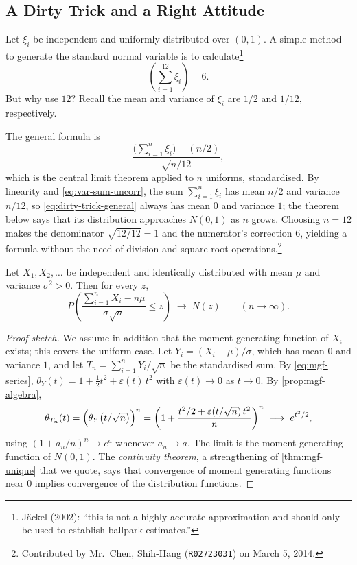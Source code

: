 \subsection{A Dirty Trick and a Right Attitude}


Let $\xi_{i}$ be independent and uniformly distributed over $(0,1)$.
A simple method to generate the standard normal variable is to calculate\footnote{J\"ackel (2002): ``this is not a highly accurate approximation and should only be used to establish ballpark estimates.''}
\begin{equation}
	\left(\sum_{i=1}^{12}\xi_{i}\right) - 6 . \label{eq:dirty-trick}
\end{equation}
But why use $12$?
Recall the mean and variance of $\xi_{i}$ are $1/2$ and $1/12$, respectively.


The general formula is
\begin{equation}
	\frac{\bigl(\sum_{i=1}^{n}\xi_{i}\bigr)-(n/2)}{\sqrt{n/12}} , \label{eq:dirty-trick-general}
\end{equation}
\suppstart
which is the central limit theorem applied to $n$ uniforms, standardised.
By linearity and \eqref{eq:var-sum-uncorr}, the sum $\sum_{i=1}^{n}\xi_{i}$ has mean $n/2$ and variance $n/12$, so \eqref{eq:dirty-trick-general} always has mean $0$ and variance $1$; the theorem below says that its distribution approaches $N(0,1)$ as $n$ grows.
\suppend
Choosing $n=12$ makes the denominator $\sqrt{12/12}=1$ and the numerator's correction $6$, yielding a formula without the need of division and square-root operations.\footnote{Contributed by Mr.~Chen, Shih-Hang (\texttt{R02723031}) on March 5, 2014.}

\suppstart
\begin{theorem}\label{thm:clt}
	Let $X_{1},X_{2},\dots$ be independent and identically distributed with mean $\mu$ and variance $\sigma^{2}>0$.
	Then for every $z$,
	\[
		P\left(\frac{\sum_{i=1}^{n}X_{i}-n\mu}{\sigma\sqrt{n}}\le z\right)\;\longrightarrow\;N(z)
		\qquad (n\to\infty) .
	\]
\end{theorem}

\begin{proof}[Proof sketch]
	We assume in addition that the moment generating function of $X_{i}$ exists; this covers the uniform case.
	Let $Y_{i}=(X_{i}-\mu)/\sigma$, which has mean $0$ and variance $1$, and let $T_{n}=\sum_{i=1}^{n}Y_{i}/\sqrt{n}$ be the standardised sum.
	By \eqref{eq:mgf-series}, $\theta_{Y}(t)=1+\tfrac12t^{2}+\varepsilon(t)\,t^{2}$ with $\varepsilon(t)\to0$ as $t\to0$.
	By \autoref{prop:mgf-algebra},
	\[
		\theta_{T_{n}}(t)=\Bigl(\theta_{Y}\bigl(t/\sqrt{n}\bigr)\Bigr)^{n}
		=\left(1+\frac{t^{2}/2+\varepsilon(t/\sqrt n)\,t^{2}}{n}\right)^{n}
		\;\longrightarrow\;e^{t^{2}/2} ,
	\]
	using $(1+a_{n}/n)^{n}\to e^{a}$ whenever $a_{n}\to a$.
	The limit is the moment generating function of $N(0,1)$.
	The \emph{continuity theorem}, a strengthening of \autoref{thm:mgf-unique} that we quote, says that convergence of moment generating functions near $0$ implies convergence of the distribution functions.
\end{proof}

